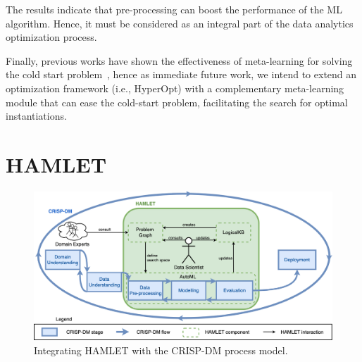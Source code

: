 The results indicate that pre-processing can boost the performance of the ML algorithm. Hence, it must be considered as an integral part of the data analytics optimization process. 

Finally, previous works have shown the effectiveness of meta-learning for solving the cold start problem~\cite{Feurer15AAAI}, hence as immediate future work, we intend to extend an optimization framework (i.e., HyperOpt) with a complementary meta-learning module that can ease the cold-start problem, facilitating the search for optimal instantiations.

\section{HAMLET}

\begin{figure}[t]
    \centering
    \includegraphics[scale=.3]{chapters/part-automl/chapter-supervised/img-hamlet/dymmymodel.png}
    \caption{Integrating HAMLET with the CRISP-DM process model.}
    \label{fig:approach}
\end{figure}

